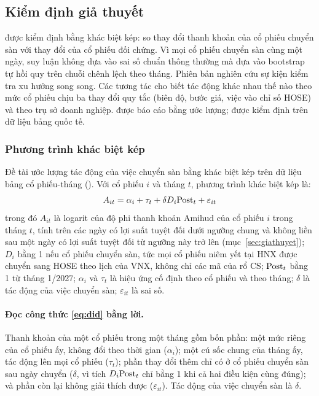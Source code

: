 \subsection{Kiểm định giả thuyết}\label{sec:kiemdinh}

\begin{tomtat}
 được kiểm định bằng khác biệt kép: so thay đổi thanh khoản của cổ phiếu chuyển sàn với thay đổi của cổ phiếu đối chứng. Vì mọi cổ phiếu chuyển sàn cùng một ngày, suy luận không dựa vào sai số chuẩn thông thường mà dựa vào bootstrap tự hồi quy trên chuỗi chênh lệch theo tháng. Phiên bản nghiên cứu sự kiện kiểm tra xu hướng song song. Các tương tác cho biết tác động khác nhau thế nào theo mức cổ phiếu chịu ba thay đổi quy tắc (biên độ, bước giá, việc vào chỉ số HOSE) và theo trụ sở doanh nghiệp.  được báo cáo bằng ước lượng;  được kiểm định trên dữ liệu bảng quốc tế.
\end{tomtat}

\subsubsection*{Phương trình khác biệt kép}

Đề tài ước lượng tác động của việc chuyển sàn bằng khác biệt kép trên dữ liệu bảng cổ phiếu-tháng (). Với cổ phiếu $i$ và tháng $t$, phương trình khác biệt kép là:
\begin{equation}\label{eq:did}
A_{it} = \alpha_i + \tau_t + \delta D_i\mathrm{Post}_t + \varepsilon_{it}
\end{equation}
trong đó $A_{it}$ là logarit của độ phi thanh khoản Amihud của cổ phiếu $i$ trong tháng $t$, tính trên các ngày có lợi suất tuyệt đối dưới ngưỡng chung và không liền sau một ngày có lợi suất tuyệt đối từ ngưỡng này trở lên (mục~\ref{sec:giathuyet}); $D_i$ bằng 1 nếu cổ phiếu chuyển sàn, tức mọi cổ phiếu niêm yết tại HNX được chuyển sang HOSE theo lịch của VNX, không chỉ các mã của rổ CS; $\mathrm{Post}_t$ bằng 1 từ tháng 1/2027; $\alpha_i$ và $\tau_t$ là hiệu ứng cố định theo cổ phiếu và theo tháng; $\delta$ là tác động của việc chuyển sàn; $\varepsilon_{it}$ là sai số.

\paragraph{Đọc công thức \eqref{eq:did} bằng lời.} Thanh khoản của một cổ phiếu trong một tháng gồm bốn phần: một mức riêng của cổ phiếu ấy, không đổi theo thời gian ($\alpha_i$); một cú sốc chung của tháng ấy, tác động lên mọi cổ phiếu ($\tau_t$); phần thay đổi thêm chỉ có ở cổ phiếu chuyển sàn sau ngày chuyển ($\delta$, vì tích $D_i\mathrm{Post}_t$ chỉ bằng 1 khi cả hai điều kiện cùng đúng); và phần còn lại không giải thích được ($\varepsilon_{it}$). Tác động của việc chuyển sàn là $\delta$.

